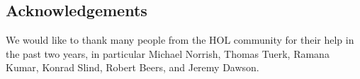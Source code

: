 
\subsection*{Acknowledgements}

We would like to thank many people from the HOL community
for their help in the past two years, in particular 
Michael Norrish, Thomas Tuerk, 
Ramana Kumar, Konrad Slind, Robert Beers, and Jeremy Dawson. 
